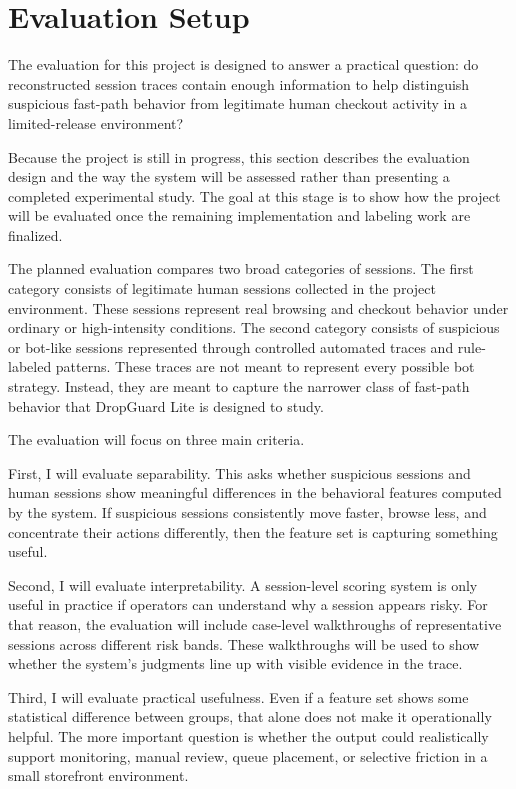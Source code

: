 \documentclass[12pt]{article}
\begin{document}
\section{Evaluation Setup}
The evaluation for this project is designed to answer a practical question: do reconstructed session traces contain enough information to help distinguish suspicious fast-path behavior from legitimate human checkout activity in a limited-release environment?

Because the project is still in progress, this section describes the evaluation design and the way the system will be assessed rather than presenting a completed experimental study. The goal at this stage is to show how the project will be evaluated once the remaining implementation and labeling work are finalized.

The planned evaluation compares two broad categories of sessions. The first category consists of legitimate human sessions collected in the project environment. These sessions represent real browsing and checkout behavior under ordinary or high-intensity conditions. The second category consists of suspicious or bot-like sessions represented through controlled automated traces and rule-labeled patterns. These traces are not meant to represent every possible bot strategy. Instead, they are meant to capture the narrower class of fast-path behavior that DropGuard Lite is designed to study.

The evaluation will focus on three main criteria.

First, I will evaluate separability. This asks whether suspicious sessions and human sessions show meaningful differences in the behavioral features computed by the system. If suspicious sessions consistently move faster, browse less, and concentrate their actions differently, then the feature set is capturing something useful.

Second, I will evaluate interpretability. A session-level scoring system is only useful in practice if operators can understand why a session appears risky. For that reason, the evaluation will include case-level walkthroughs of representative sessions across different risk bands. These walkthroughs will be used to show whether the system’s judgments line up with visible evidence in the trace.

Third, I will evaluate practical usefulness. Even if a feature set shows some statistical difference between groups, that alone does not make it operationally helpful. The more important question is whether the output could realistically support monitoring, manual review, queue placement, or selective friction in a small storefront environment.
\end{document}
